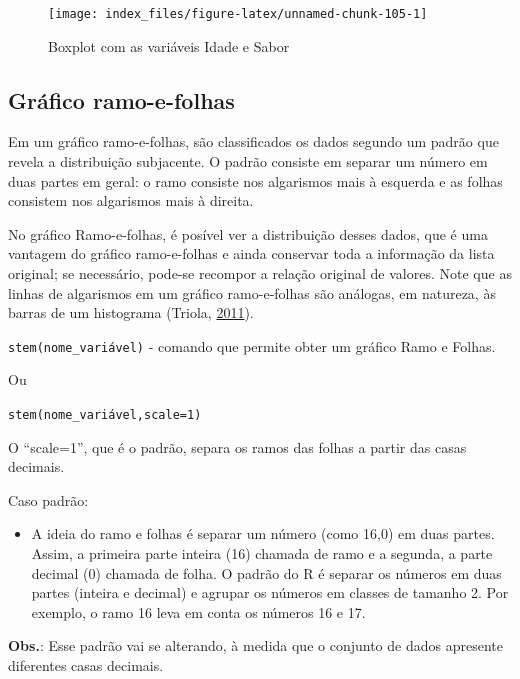 \documentclass[12pt,brazil,oneside]{book}
\providecommand{\tightlist}{%
  \setlength{\itemsep}{0pt}\setlength{\parskip}{0pt}}
\begin{document}
\begin{figure}[H]

{\centering \texttt{[image: index\_files/figure-latex/unnamed-chunk-105-1]} 

}

\caption{Boxplot com as variáveis Idade e Sabor}\label{fig:unnamed-chunk-105}
\end{figure}

\hypertarget{grafico-ramo-e-folhas}{%
\subsection{Gráfico ramo-e-folhas}\label{grafico-ramo-e-folhas}}

Em um gráfico ramo-e-folhas, são classificados os dados segundo um padrão que revela a distribuição subjacente. O padrão consiste em separar um número em duas partes em geral: o ramo consiste nos algarismos mais à esquerda e as folhas consistem nos algarismos mais à direita.

No gráfico Ramo-e-folhas, é posível ver a distribuição desses dados, que é uma vantagem do gráfico ramo-e-folhas e ainda conservar toda a informação da lista original; se necessário, pode-se recompor a relação original de valores. Note que as linhas de algarismos em um gráfico ramo-e-folhas são análogas, em natureza, às barras de um histograma (Triola, \protect\hyperlink{ref-triola1999}{2011}).

\texttt{stem(nome\_variável)} - comando que permite obter um gráfico Ramo e Folhas.

Ou

\texttt{stem(nome\_variável,scale=1)}

O ``scale=1'', que é o padrão, separa os ramos das folhas a partir das casas decimais.

Caso padrão:

\begin{itemize}
\tightlist
\item
  A ideia do ramo e folhas é separar um número (como 16,0) em duas partes. Assim, a primeira parte inteira (16) chamada de ramo e a segunda, a parte decimal (0) chamada de folha. O padrão do R é separar os números em duas partes (inteira e decimal) e agrupar os números em classes de tamanho 2. Por exemplo, o ramo 16 leva em conta os números 16 e 17.
\end{itemize}

\textbf{Obs.}: Esse padrão vai se alterando, à medida que o conjunto de dados apresente diferentes casas decimais.
\end{document}
